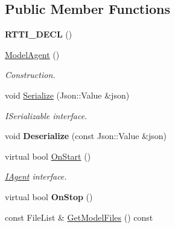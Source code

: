 \subsection*{Public Member Functions}
\begin{DoxyCompactItemize}
\item 
\mbox{\label{class_model_agent_a7718df479a7722905a87ec3d4c46bd15}} 
{\bfseries R\+T\+T\+I\+\_\+\+D\+E\+CL} ()
\item 
\mbox{\label{class_model_agent_ad108cb8a2224b171c2e73f11fcca1929}} 
\hyperlink{class_model_agent_ad108cb8a2224b171c2e73f11fcca1929}{Model\+Agent} ()
\begin{DoxyCompactList}\small\item\em Construction. \end{DoxyCompactList}\item 
\mbox{\label{class_model_agent_a1aa79fdeba8748e91c850482a8d90203}} 
void \hyperlink{class_model_agent_a1aa79fdeba8748e91c850482a8d90203}{Serialize} (Json\+::\+Value \&json)
\begin{DoxyCompactList}\small\item\em I\+Serializable interface. \end{DoxyCompactList}\item 
\mbox{\label{class_model_agent_af79efe6ce6c2ab60b4089f79300975d3}} 
void {\bfseries Deserialize} (const Json\+::\+Value \&json)
\item 
\mbox{\label{class_model_agent_afd32cf6c082d96df2418822b866460ed}} 
virtual bool \hyperlink{class_model_agent_afd32cf6c082d96df2418822b866460ed}{On\+Start} ()
\begin{DoxyCompactList}\small\item\em \hyperlink{class_i_agent}{I\+Agent} interface. \end{DoxyCompactList}\item 
\mbox{\label{class_model_agent_a10288ed4e99bd24c6faf305af56d62dd}} 
virtual bool {\bfseries On\+Stop} ()
\item 
\mbox{\label{class_model_agent_ac7d469fa7ed30865e22b111041cd8966}} 
const File\+List \& \hyperlink{class_model_agent_ac7d469fa7ed30865e22b111041cd8966}{Get\+Model\+Files} () const

\end{DoxyCompactItemize}
